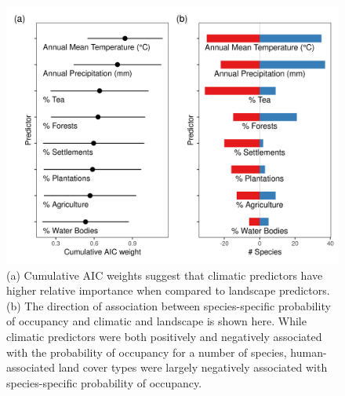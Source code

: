 \documentclass[]{article}
\begin{document}
\begin{figure}
\centering
\includegraphics{figs/fig_04_aic_weight_effect.png}
\caption{(a) Cumulative AIC weights suggest that climatic predictors have higher relative importance when compared to landscape predictors. (b) The direction of association between species-specific probability of occupancy and climatic and landscape is shown here. While climatic predictors were both positively and negatively associated with the probability of occupancy for a number of species, human-associated land cover types were largely negatively associated with species-specific probability of occupancy.}
\end{figure}
\end{document}
